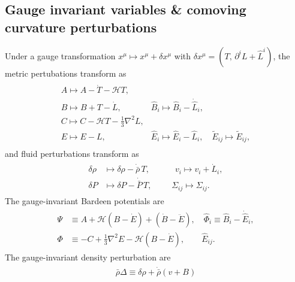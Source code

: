 \subsection{Gauge invariant variables \& comoving curvature perturbations}
Under a gauge transformation $x^\mu \mapsto x^\mu +\delta x^\mu$ with $\delta x^\mu=(T,\,\partial^i L+\hat{L}^i)$, the metric pertubations transform as
\begin{align}\label{eq:gauge_transformation_metric}
\begin{aligned}
    \begin{array}{ll}
    A \mapsto A-\dot{T}-\mathcal{H} T, & \\
    B \mapsto B+T-\dot{L}, & \hat{B}_{i} \mapsto \hat{B}_{i}-\dot{\hat{L}}_{i}, \\
    C \mapsto C-\mathcal{H} T-\frac{1}{3} \nabla^{2} L, & \\
    E \mapsto E-L, & \hat{E}_{i} \mapsto \hat{E}_{i}-\hat{L}_{i}, \quad \tilde{E}_{i j} \mapsto \tilde{E}_{i j},
    \end{array}
\end{aligned}
\end{align}
and fluid perturbations transform as
\begin{align}\label{eq:gauge_transformation_em_tensor}
\begin{aligned}
    \delta \rho & \mapsto \delta \rho-\dot{\bar{\rho}}\, T, \quad\qquad v_{i}  \mapsto v_{i}+\dot{L}_{i},\\[2pt]
    \delta P & \mapsto \delta P-\dot{\bar{P}}\, T, \,\,\qquad \Sigma_{i j}  \mapsto \Sigma_{i j}.
\end{aligned}
\end{align}
The gauge-invariant Bardeen potentials are
\begin{align}
\begin{aligned}
    \Psi & \equiv A+\mathcal{H}\left(B-\dot{E}\right)+\left(\dot{B}-\ddot{E}\right), \quad \hat{\Phi}_{i} \equiv \hat{B}_{i}-\dot{\hat{E}}_{i}, \\
    \Phi & \equiv-C+\frac{1}{3} \nabla^{2} E-\mathcal{H}\left(B-\dot{E}\right), \qquad \hat{E}_{i j}.
\end{aligned}
\end{align}
The gauge-invariant density perturbation are
\begin{align}
\begin{aligned}
    \bar{\rho} \Delta \equiv \delta \rho+\dot{\bar{\rho}}(v+B)
\end{aligned}
\end{align}
